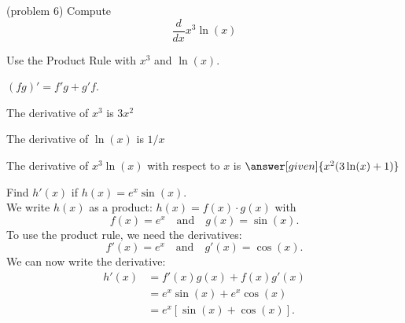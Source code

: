 \documentclass{ximera}
\begin{document}
\begin{center}
\begin{foldable}
\end{foldable}
\end{center}



\begin{problem}(problem 6)
  Compute
  \[
  \frac{d}{dx} x^3\ln(x)
  \]
  
    \begin{hint}
      Use the Product Rule with $x^3$ and $\ln(x)$.
    \end{hint}
    \begin{hint}
      $(fg)' = f'g+g'f$.
    \end{hint}
    \begin{hint}
      The derivative of $x^3$ is $3x^2$
    \end{hint}
    \begin{hint}
      The derivative of $\ln(x)$ is $1/x$
    \end{hint}
		The derivative of $x^3\ln(x)$ with respect to $x$ is
		 $\answer[given]{x^2(3 \ln(x) + 1)}$
		
\end{problem}


\begin{example}[example 7]
Find $h'(x)$ if $h(x) = e^x\sin(x)$.\\
We write $h(x)$ as a product: $h(x) = f(x)\cdot g(x)$ with
\[f(x) = e^x \quad \text{and} \quad g(x) = \sin(x).\]
To use the product rule, we need the derivatives:
\[f'(x) = e^x \quad \text{and} \quad g'(x) = \cos(x).\]
We can now write the derivative:
\begin{align*}
h'(x) &= f'(x)g(x) + f(x)g'(x) \\
&= e^x \sin(x) + e^x \cos(x) \\
&= e^x[\sin(x) +  \cos(x)].
\end{align*}
\end{example}


\begin{center}
\begin{foldable}
\end{foldable}
\end{center}
\end{document}
